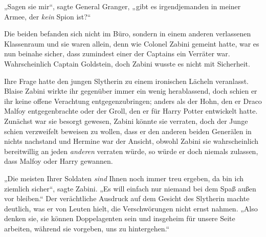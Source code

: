 „Sagen sie mir“, sagte General Granger, „gibt es irgendjemanden in meiner Armee, der \emph{kein} Spion ist?“

Die beiden befanden sich nicht im Büro, sondern in einem anderen verlassenen Klassenraum und sie waren allein, denn wie Colonel Zabini gemeint hatte, war es nun beinahe sicher, dass zumindest einer der Captains ein Verräter war. Wahrscheinlich Captain Goldstein, doch Zabini wusste es nicht mit Sicherheit.

Ihre Frage hatte den jungen Slytherin zu einem ironischen Lächeln veranlasst. Blaise Zabini wirkte ihr gegenüber immer ein wenig herablassend, doch schien er ihr keine offene Verachtung entgegenzubringen; anders als der Hohn, den er Draco Malfoy entgegenbrachte oder der Groll, den er für Harry Potter entwickelt hatte. Zunächst war sie besorgt gewesen, Zabini könnte sie verraten, doch der Junge schien verzweifelt beweisen zu wollen, dass er den anderen beiden Generälen in nichts nachstand und Hermine war der Ansicht, obwohl Zabini sie wahrscheinlich bereitwillig an jeden \emph{anderen} verraten würde, so würde er doch niemals zulassen, dass Malfoy oder Harry gewannen.

„Die meisten Ihrer Soldaten \emph{sind} Ihnen noch immer treu ergeben, da bin ich ziemlich sicher“, sagte Zabini.
„Es will einfach nur niemand bei dem Spaß außen vor bleiben.“ Der verächtliche Ausdruck auf dem Gesicht des Slytherin machte deutlich, was er von Leuten hielt, die Verschwörungen nicht ernst nahmen.
„Also denken sie, sie können Doppelagenten sein und insgeheim für unsere Seite arbeiten, während sie vorgeben, uns zu hintergehen.“

